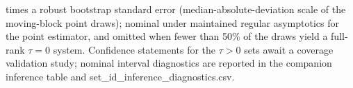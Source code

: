 \begin{table}[!htbp]
\begin{threeparttable}
\begin{tablenotes}[flushleft]
times a robust bootstrap standard error (median-absolute-deviation scale of the moving-block point draws); nominal under maintained regular asymptotics for the point estimator, and omitted when fewer than 50\% of the draws yield a full-rank $\tau{=}0$ system. Confidence statements for the $\tau{>}0$ sets await a coverage validation study; nominal interval diagnostics are reported in the companion inference table and set\_id\_inference\_diagnostics.csv.
\end{tablenotes}
\end{threeparttable}
\end{table}
